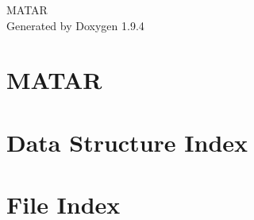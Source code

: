 \documentclass[twoside]{book}
\newcommand{\+}{\discretionary{\mbox{\scriptsize$\hookleftarrow$}}{}{}}
\newcommand{\clearemptydoublepage}{%
    \newpage{\pagestyle{empty}\cleardoublepage}%
  }
\begin{document}
  \raggedbottom
    \hypersetup{pageanchor=false,
                bookmarksnumbered=true,
                pdfencoding=unicode
               }
  \begin{titlepage}
  \vspace*{7cm}
  \begin{center}%
  {\Large MATAR}\\
  \vspace*{1cm}
  {\large Generated by Doxygen 1.9.4}\\
  \end{center}
  \end{titlepage}
  \clearemptydoublepage
  \tableofcontents
  \clearemptydoublepage
  \hypersetup{pageanchor=true}
\chapter{MATAR}
\label{index}\hypertarget{index}{}
\chapter{Data Structure Index}

\chapter{File Index}

\end{document}
